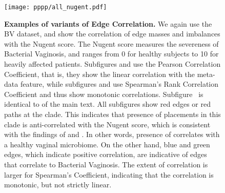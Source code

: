 \begin{figure}[hpbt]
    \centering
    \texttt{[image: pppp/all\_nugent.pdf]}
    \begin{subfigure}{0pt}
        \label{fig:all_nugent:sub:pcc_em}
    \end{subfigure}
    \begin{subfigure}{0pt}
        \label{fig:all_nugent:sub:pcc_ei}
    \end{subfigure}
    \begin{subfigure}{0pt}
        \label{fig:all_nugent:sub:srcc_em}
    \end{subfigure}
    \begin{subfigure}{0pt}
        \label{fig:all_nugent:sub:srcc_ei}
    \end{subfigure}
    \caption[Examples of variants of Edge Correlation]{
        \textbf{Examples of variants of Edge Correlation.}
        We again use the \ac{BV} dataset, and show the correlation of edge masses and imbalances with the Nugent score.
        The Nugent score measures the severeness of Bacterial Vaginosis,
        and ranges from \num{0} for healthy subjects to \num{10} for heavily affected patients.
        Subfigures  and  use the
        Pearson Correlation Coefficient, that is, they show the linear correlation with the meta-data feature,
        while subfigures  and  use
        Spearman's Rank Correlation Coefficient and thus show monotonic correlations.
        Subfigure~ is identical to  of the main text.
        All subfigures show red edges or red paths at the  clade.
        This indicates that presence of placements in this clade is anti-correlated with the Nugent score,
        which is consistent with the findings of \cite{Srinivasan2012} and \cite{Matsen2011a}.
        In other words, presence of  correlates with a healthy vaginal microbiome.
        On the other hand, blue and green edges, which indicate positive correlation,
        are indicative of edges that correlate to Bacterial Vaginosis.
        The extent of correlation is larger for Spearman's Coefficient,
        indicating that the correlation is monotonic, but not strictly linear.
    }
    \label{fig:all_nugent}
\end{figure}


